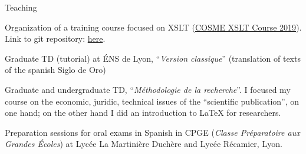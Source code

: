 










\begin{rubric}{Teaching}
                                \entry*[2018-2019]
                                
                            Organization of a training course focused on
                XSLT (\href{https://cosme.hypotheses.org/1117}{COSME XSLT Course 2019}).
                Link to git repository: \href{https://github.com/gabays/Cours\_COSME\_2019}{here}.
                    
                                \entry*
                            Graduate TD (tutorial) at ÉNS de Lyon,
                \enquote{\textit{Version classique}} (translation of texts of the spanish
                Siglo de Oro)
                    
                                \entry*
                            Graduate and undergraduate TD,
                \enquote{\textit{Méthodologie de la recherche}}. I focused my course on the
                economic, juridic, technical issues of the \enquote{scientific publication}, on one
                hand; on the other hand I did an introduction to LaTeX for researchers.
                    
                                \entry*[2017-2018]
                                
                            Preparation sessions for oral exams in Spanish in CPGE (\textit{Classe
                        Préparatoire aux Grandes Écoles}) at Lycée La Martinière Duchère and
                        Lycée Récamier, Lyon.
                    \end{rubric}


